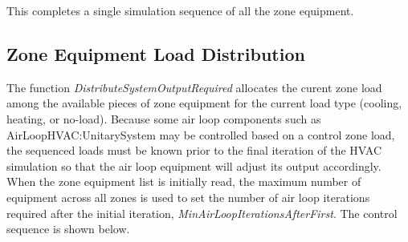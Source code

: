 This completes a single simulation sequence of all the zone equipment.

\subsection{Zone Equipment Load Distribution}\label{zone-equipment-load-distribution}

The function \emph{DistributeSystemOutputRequired} allocates the curent zone load among the available pieces of zone equipment for the current load type (cooling, heating, or no-load). Because some air loop components such as AirLoopHVAC:UnitarySystem may be controlled based on a control zone load, the sequenced loads must be known prior to the final iteration of the HVAC simulation so that the air loop equipment will adjust its output accordingly. When the zone equipment list is initially read, the maximum number of equipment across all zones is used to set the number of air loop iterations required after the initial iteration, \emph{MinAirLoopIterationsAfterFirst}. The control sequence is shown below.
